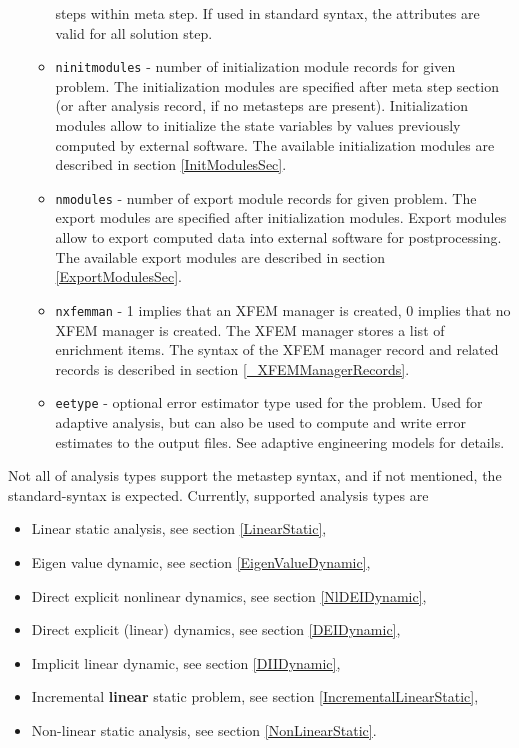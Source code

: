 \documentclass[a4paper]{article}
\newcommand{\param}[1]{\texttt{#1}} %
\begin{document}
\begin{itemize}
\begin{itemize}
steps within meta step. If used in standard syntax, the attributes are
valid for all solution step.
\item \param{ninitmodules} - number of initialization module records for given
problem. The initialization modules are specified after meta step section (or
after analysis record, if no metasteps are present). Initialization modules
allow to initialize the state variables by values previously computed by 
external software. The available initialization modules are described in section
\ref{InitModulesSec}.
\item \param{nmodules} - number of export module records for given
problem. The export modules are specified after initialization modules. Export modules
allow to export computed data into external software for
postprocessing. The available export modules are described in section
\ref{ExportModulesSec}.
\item \param{nxfemman} - 1 implies that an XFEM manager is created, 0 implies
that no XFEM manager is created. The XFEM manager stores a list of enrichment
items. The syntax of the XFEM manager record and related records is described in
section \ref{_XFEMManagerRecords}.
\item \param{eetype} - optional error estimator type used for the problem.
Used for adaptive analysis, but can also be used to compute and write error estimates to the output files. See adaptive engineering models for details.
\end{itemize}

\end{itemize}
Not all of analysis types support the metastep syntax, and if
not mentioned, the standard-syntax is expected.
Currently, supported analysis types are

\begin{itemize}
\item Linear static analysis, see section \ref{LinearStatic},
\item Eigen value dynamic, see section \ref{EigenValueDynamic},
\item Direct explicit  nonlinear dynamics, see section
\ref{NlDEIDynamic},
\item Direct explicit (linear) dynamics, see section \ref{DEIDynamic},
\item Implicit linear dynamic, see section \ref{DIIDynamic},
\item Incremental \textbf{linear} static problem, see section \ref{IncrementalLinearStatic},
\item Non-linear static analysis, see section \ref{NonLinearStatic}.
\end{itemize}
\end{document}

